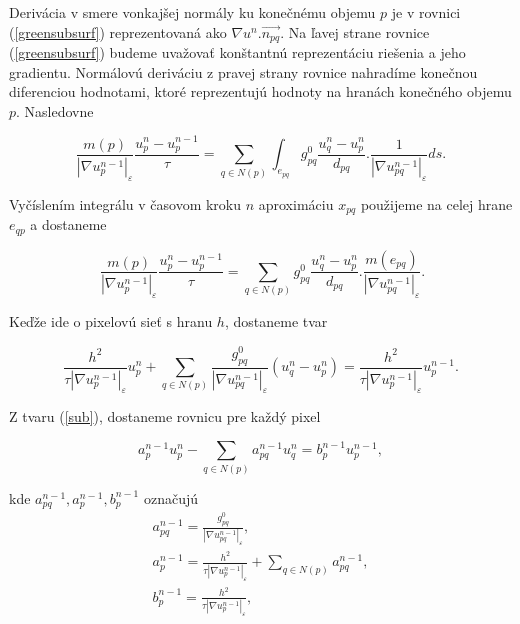 \documentclass[a4paper,11pt,twoside]{article}%
\def\epsilon{\varepsilon}
\begin{document}
Derivácia v smere vonkajšej normály ku konečnému objemu $p$ je v rovnici (\ref{greensubsurf}) reprezentovaná ako $\nabla u^n.\vec{n_{pq}}$. Na ľavej strane rovnice (\ref{greensubsurf}) budeme uvažovať konštantnú reprezentáciu riešenia a jeho gradientu. Normálovú deriváciu z pravej strany rovnice nahradíme konečnou diferenciou hodnotami, ktoré reprezentujú hodnoty na hranách konečného objemu $p$. Nasledovne

\begin{equation}
\frac{m(p)}{|\nabla u_p^{n-1}|_{\epsilon}}\frac{u_p^n-u_p^{n-1}}{\tau} = \sum_{q \in N(p)}\int_{e_{pq}}g_{pq}^0\frac{u_q^n - u_p^n}{d_{pq}}.\frac{1}{|\nabla u_{pq}^{n-1}|_{\epsilon}}ds.
\end{equation}

Vyčíslením integrálu v časovom kroku $n$ aproximáciu $x_{pq}$ použijeme na celej hrane $e_{qp}$ a dostaneme

\begin{equation} \
\frac{m(p)}{|\nabla u_p^{n-1}|_{\epsilon}}\frac{u_p^n-u_p^{n-1}}{\tau} = \sum_{q \in N(p)}g_{pq}^0\frac{u_q^n - u_p^n}{d_{pq}}.\frac{m(e_{pq})}{|\nabla u_{pq}^{n-1}|_{\epsilon}}.
\end{equation}

Keďže ide o pixelovú sieť s hranu $h$, dostaneme tvar

\begin{equation} \label{sub}
\frac{h^2}{\tau|\nabla u_p^{n-1}|_{\epsilon}}u_p^n + \sum_{q \in N(p)}\frac{g_{pq}^0}{|\nabla u_{pq}^{n-1}|_{\epsilon}}(u_q^n - u_p^n) = \frac{h^2}{\tau|\nabla u_p^{n-1}|_{\epsilon}}u_p^{n - 1}.
\end{equation}

Z tvaru (\ref{sub}), dostaneme rovnicu pre každý pixel

\begin{equation}
a_p^{n - 1}u_p^n - \sum_{q \in N(p)} a_{pq}^{n - 1}u_q^n =b_p^{n-1}u_p^{n-1},
\end{equation}

kde $a_{pq}^{n - 1}, a_p^{n - 1}, b_p^{n - 1}$ označujú
\begin{equation}
\begin{array}{l}
a_{pq}^{n - 1}  = \frac{g_{pq}^{0}}{|\nabla u_{pq}^{n-1}|_{\epsilon}}, \\
a_p^{n - 1} = \frac{h^2}{\tau|\nabla u_p^{n-1}|_{\epsilon}} + \sum_{q \in N(p)} a_{pq}^{n - 1}, \\
b_p^{n - 1} = \frac{h^2}{\tau|\nabla u_p^{n-1}|_{\epsilon}}, \\
\end{array}
\end{equation}
\end{document}
